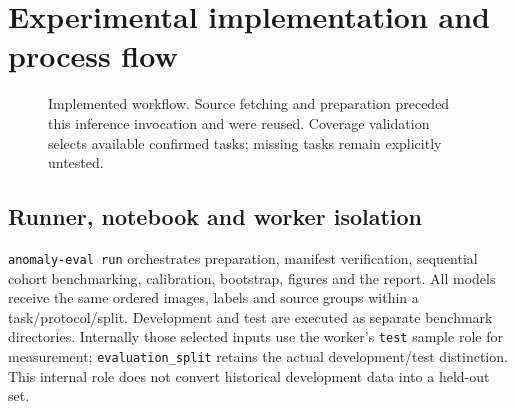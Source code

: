 \documentclass[11pt,a4paper]{article}
\newcommand{\code}[1]{\nolinkurl{#1}}
\begin{document}
\section{Experimental implementation and process flow}
\begin{figure}[htbp]\centering
{}
\caption{Implemented workflow. Source fetching and preparation preceded this inference invocation and were reused. Coverage validation selects available confirmed tasks; missing tasks remain explicitly untested.}
\label{fig:flow}\end{figure}

\subsection{Runner, notebook and worker isolation}
\code{anomaly-eval run} orchestrates preparation, manifest verification, sequential cohort benchmarking, calibration, bootstrap, figures and the report. All models receive the same ordered images, labels and source groups within a task/protocol/split. Development and test are executed as separate benchmark directories. Internally those selected inputs use the worker's \code{test} sample role for measurement; \code{evaluation_split} retains the actual development/test distinction. This internal role does not convert historical development data into a held-out set.
\end{document}
